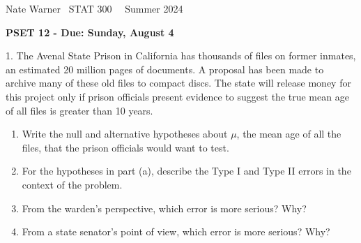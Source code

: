 \documentclass{report}
\title{\Huge{}}
\author{\huge{Nathan Warner}}
\date{\huge{}}
\begin{document}
 \pagebreak \bigbreak \noindent
 Nate Warner \ \quad \quad \quad \quad \quad \quad \quad \quad \quad \quad \quad \quad  STAT 300 \quad  \quad \quad \quad \quad \quad \quad \quad \quad \ \ \quad Summer 2024
 \begin{center}
     \textbf{PSET 12 - Due: Sunday, August 4}
 \end{center}
 \bigbreak \noindent 
\begin{mdframed}
1. The Avenal State Prison in California has thousands of files on former inmates, an estimated 20 million pages of documents. A proposal has been made to archive many of these old files to compact discs. The state will release money for this project only if prison officials present evidence to suggest the true mean age of all files is greater than 10 years.
    \begin{enumerate}[label=(\alph*)]
        \item Write the null and alternative hypotheses about $\mu$, the mean age of all the files, that the prison officials would want to test.
        \item For the hypotheses in part (a), describe the Type I and Type II errors in the context of the problem.
        \item From the warden’s perspective, which error is more serious? Why?
        \item From a state senator’s point of view, which error is more serious? Why?
    \end{enumerate}
\end{mdframed}
\end{document}
